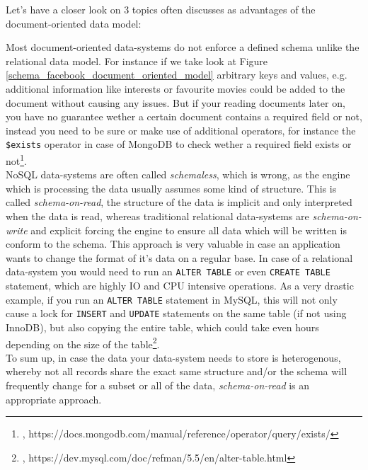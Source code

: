 {Let's have a closer look on 3 topics often discusses as advantages of the document-oriented data model:

Most document-oriented data-systems do not enforce a defined schema unlike the relational data model. For instance if we take look at Figure \ref{schema_facebook_document_oriented_model} arbitrary keys and values, e.g. additional information like interests or favourite movies could be added to the document without causing any issues. But if your reading documents later on, you have no guarantee wether a certain document contains a required field or not, instead you need to be sure or make use of additional operators, for instance the \lstinline{$exists} operator in case of MongoDB to check wether a required field exists or not\footnote{\cite{MDBEX}, https://docs.mongodb.com/manual/reference/operator/query/exists/}. \\
NoSQL data-systems are often called \textit{schemaless}, which is wrong, as the engine which is processing the data usually assumes some kind of structure. This is called \textit{schema-on-read}, the structure of the data is implicit and only interpreted when the data is read, whereas traditional relational data-systems are \textit{schema-on-write} and explicit forcing the engine to ensure all data which will be written is conform to the schema. This approach is very valuable in case an application wants to change the format of it's data on a regular base. In case of a relational data-system you would need to run an \lstinline{ALTER TABLE} or even \lstinline{CREATE TABLE} statement, which are highly IO and CPU intensive operations. As a very drastic example, if you run an \lstinline{ALTER TABLE} statement in MySQL, this will not only cause a lock for \lstinline{INSERT} and \lstinline{UPDATE} statements on the same table (if not using InnoDB), but also copying the entire table, which could take even hours depending on the size of the table\footnote{\cite{MYSQLAT}, https://dev.mysql.com/doc/refman/5.5/en/alter-table.html}.\\
To sum up, in case the data your data-system needs to store is heterogenous, whereby not all records share the exact same structure and/or the schema will frequently change for a subset or all of the data, \textit{schema-on-read} is an appropriate approach.

}
